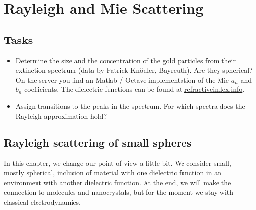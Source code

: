 

\chapter{Rayleigh and Mie Scattering}

\label{chap:rayleigh_and_mie}



\section{Tasks}

\begin{itemize}
\item Determine the size and the concentration of the gold particles from their extinction spectrum (data by Patrick Knödler, Bayreuth). Are they spherical? On the server you find an Matlab / Octave implementation of the Mie $a_n$ and $b_n$ coefficients. The dielectric functions can be found at \href{https://refractiveindex.info/}{refractiveindex.info}.

\item Assign transitions to the peaks in the spectrum. For which spectra does the Rayleigh approximation hold?


\end{itemize}


\section{Rayleigh scattering of small spheres}


In this chapter, we change our point of view a little bit. We consider small, mostly spherical, inclusion of material with one dielectric function in an environment with another dielectric function. At the end, we will make the connection to molecules and nanocrystals, but for the moment we stay with classical electrodynamics.


